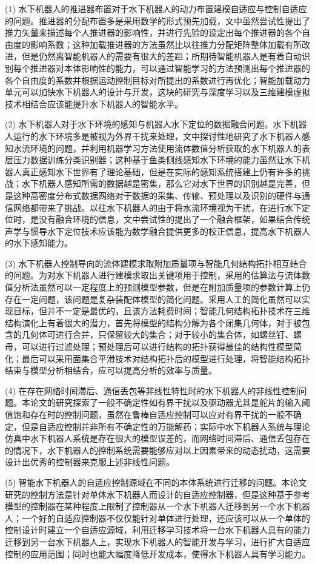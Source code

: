 (1) 水下机器人的推进器布置对于水下机器人的动力布置建模自适应与控制自适应的问题。推进器的分配布置多是采用数学的形式预先加载，文中虽然尝试性提出了推力矢量来描述每个人推进器的影响性，并进行先验的设定出每个推进器的各个自由度的影响系数；这种加载推进器的方法虽然比以往推力分配矩阵整体加载有所改进，但是仍然离智能机器人的需要有很大的差距；所期待智能机器人是有着自动识别每个推进器对本体影响性的能力，可以通过智能学习的方法预测出每个推进器的各个自由度的系数并根据运动控制目标对所提出的系数进行再优化；智能加载动力单元可以加快水下机器人的设计与开发，这块的研究与深度学习以及三维建模虚拟技术相结合应该能提升水下机器人的智能水平。

(2) 水下机器人对于水下环境的感知与机器人水下定位的数据融合问题。水下机器人运行的水下环境多是被视为外界干扰来处理，文中探讨性地研究了水下机器人感知水流环境的问题，并利用机器学习方法使用流体数值分析获取的水下机器人的表层压力数据训练分类识别器；这种基于鱼类侧线感知水下环境的能力虽然让水下机器人真正感知水下世界有了理论基础，但是在实际的感知系统搭建上仍有许多的挑战；水下机器人感知所需的数据越是密集，那么它对水下世界的识别越是完善，但是这种高密度分布式数据网络对于数据的采集、传输、预处理以及识别的硬件与通信网络都带来了挑战。以往水下机器人的由于将水流环境视为干扰，在进行水下定位时，是没有融合环境的信息，文中尝试性的提出了一个融合框架，如果结合传统声学与惯导水下定位技术应该能为数学融合提供更多的校正信息，提高水下机器人的水下感知能力。

(3) 水下机器人控制导向的流体建模求取附加质量项与智能几何结构拓扑相互结合的问题。为对水下机器人进行建模求取出关键项用于控制，采用的估算法与流体数值分析法虽然可以一定程度上的预测模型参数，但是在附加质量项的参数计算上仍存在一定问题，该问题是复杂装配体模型的简化问题。采用人工的简化虽然可以实现目标，但并不一定是最优的，且该方法耗费时间；智能几何结构拓扑技术在三维结构演化上有着很大的潜力，首先将模型的结构分解为各个闭集几何体，对于被包含的几何体可进行合并，只保留较大的集合；对于较小的集合体，如螺丝钉、螺母，可以进行过滤处理；预处理后可以进行结构的拓扑获得最佳的结构性模型简化；最后可以采用面集合平滑技术对结构拓扑后的模型进行处理，将智能结构拓扑结束与模型分析相结合，应可以提高分析的效率与质量。

(4) 在存在网络时间滞后、通信丢包等非线性特性时的水下机器人的非线性控制问题。本论文的研究探索了一般不确定性如有界干扰以及驱动器尤其是舵片的输入阈值饱和存在时的控制问题，虽然在鲁棒自适应控制可以应对有界干扰的一般不确定，但是自适应控制并非所有不确定性的万能解药；实际中水下机器人系统与理论仿真中水下机器人系统是存在很大的模型误差的，而网络时间滞后、通信丢包存在的情况下，水下机器人的控制系统需要能够应对以上因素带来的动态扰动，这需要设计出优秀的控制器来克服上述非线性问题。

(5) 智能水下机器人的自适应控制源域在不同的本体系统进行迁移的问题。本论文研究的控制方法是针对单体水下机器人而设计的自适应控制器，但是这种基于参考模型的控制器在某种程度上限制了控制器从一个水下机器人迁移到另一个水下机器人；一个好的自适应控制器不仅仅能针对单体进行处理，还应该可以从一个单体的控制设计时建立一个自适应源域，利用迁移学习技术将一台水下机器人具有的能力迁移到另一台水下机器人上，实现水下机器人的智能开发与学习，进行扩大自适应控制的应用范围；同时也能大幅度降低开发成本，使得水下机器人具有学习能力。
